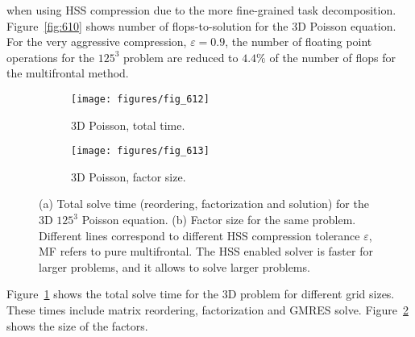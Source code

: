 \documentclass{article}
\begin{document}
when using HSS compression due to the more fine-grained task
decomposition.
Figure~\ref{fig:610} shows number of flops-to-solution for the 3D
Poisson equation. For the very aggressive compression,
$\varepsilon=0.9$, the number of floating point operations for the
$125^3$ problem are reduced to $4.4\%$ of the number of flops for the
multifrontal method.
\begin{figure}
  \begin{center}
    \begin{subfigure}{.49\textwidth}
      \texttt{[image: figures/fig\_612]}
      \caption{\footnotesize 3D Poisson, total time.}
      \label{fig:612}
    \end{subfigure}
    \begin{subfigure}{.49\textwidth}
      \texttt{[image: figures/fig\_613]}
      \caption{\footnotesize 3D Poisson, factor size.}
      \label{fig:613}
    \end{subfigure}
  \end{center}
  \caption{\footnotesize (a) Total solve time (reordering, factorization and
    solution) for the 3D $125^3$ Poisson equation. (b) Factor size for
    the same problem. Different lines correspond to different HSS
    compression tolerance $\varepsilon$, MF refers to pure
    multifrontal. The HSS enabled solver is faster for larger
    problems, and it allows to solve larger problems.}
  \label{fig:Poisson3D_time_mem}
\end{figure}
Figure~\ref{fig:612} shows the total solve time for the 3D problem for
different grid sizes. These times include matrix reordering,
factorization and GMRES solve. Figure~\ref{fig:613} shows the size of
the factors.
\end{document}
